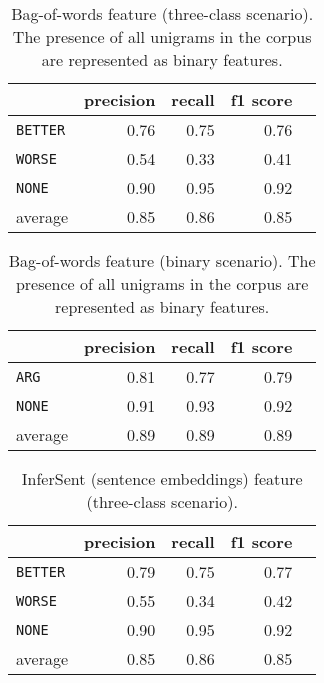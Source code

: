 \begin{table}[htbp] 
	\centering 
	\caption{Bag-of-words feature (three-class scenario). The presence of all unigrams in the corpus are represented as binary features.} 
	\begin{tabular}{@{}lrrrr@{}}
		\toprule
		                & precision & recall & f1 score \\ \midrule 
		\texttt{BETTER} & 0.76      & 0.75   & 0.76     \\ 
		\texttt{WORSE}  & 0.54      & 0.33   & 0.41     \\ 
		\texttt{NONE}   & 0.90      & 0.95   & 0.92     \\ 
		average         & 0.85      & 0.86   & 0.85     \\ 			\bottomrule
	\end{tabular}
\end{table}

\begin{table}[h] 
	\centering 
	\caption{Bag-of-words feature (binary scenario). The presence of all unigrams in the corpus are represented as binary features.} 
	\begin{tabular}{@{}lrrrr@{}}
		\toprule
		                & precision & recall & f1 score \\ \midrule 
		\texttt{ARG}    & 0.81      & 0.77   & 0.79     \\ 
		\texttt{NONE}   & 0.91      & 0.93   & 0.92     \\ 
		average         & 0.89      & 0.89   & 0.89     \\ 			\bottomrule
	\end{tabular}
\end{table}


\begin{table}[htbp] 
	\centering 
	\caption{InferSent (sentence embeddings) feature (three-class scenario).} 
	\begin{tabular}{@{}lrrrr@{}}
		\toprule
		                & precision & recall & f1 score \\ \midrule 
		\texttt{BETTER} & 0.79      & 0.75   & 0.77     \\ 
		\texttt{WORSE}  & 0.55      & 0.34   & 0.42     \\ 
		\texttt{NONE}   & 0.90      & 0.95   & 0.92     \\ 
		average         & 0.85      & 0.86   & 0.85     \\ 			\bottomrule
	\end{tabular}
\end{table}

